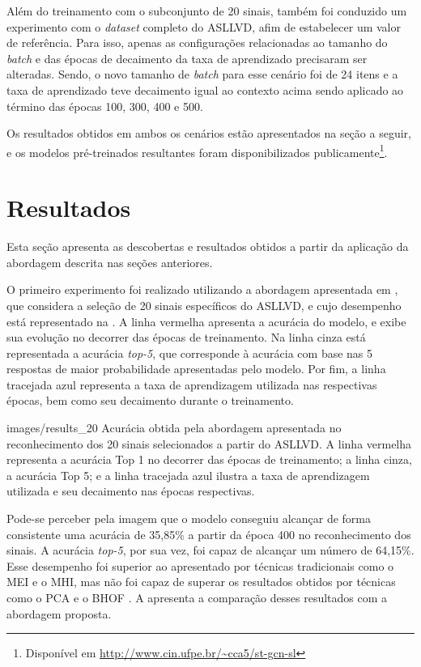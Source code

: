 Além do treinamento com o subconjunto de 20 sinais, também foi conduzido um experimento com o \textit{dataset} completo do ASLLVD, afim de estabelecer um valor de referência. Para isso, apenas as configurações relacionadas ao tamanho do \textit{batch} e das épocas de decaimento da taxa de aprendizado precisaram ser alteradas. Sendo, o novo tamanho de \textit{batch} para esse cenário foi de 24 itens e a taxa de aprendizado teve decaimento igual ao contexto acima sendo aplicado ao término das épocas 100, 300, 400 e 500.

Os resultados obtidos em ambos os cenários estão apresentados na seção a seguir, e os modelos pré-treinados resultantes foram disponibilizados publicamente\footnote{
    Disponível em \url{http://www.cin.ufpe.br/~cca5/st-gcn-sl}
}.


\section{Resultados} %
\label{sec:resultados}

Esta seção apresenta as descobertas e resultados obtidos a partir da aplicação da abordagem descrita nas seções anteriores. 

O primeiro experimento foi realizado utilizando a abordagem apresentada em \cite{lim-2016}, que considera a seleção de 20 sinais específicos do ASLLVD, e cujo desempenho está representado na . A linha vermelha apresenta a acurácia do modelo, e exibe sua evolução no decorrer das épocas de treinamento. Na linha cinza está representada a acurácia \textit{top-5}, que corresponde à acurácia com base nas 5 respostas de maior probabilidade apresentadas pelo modelo. Por fim, a linha tracejada azul representa a taxa de aprendizagem utilizada nas respectivas épocas, bem como seu decaimento durante o treinamento.

    {images/results_20}
    {Acurácia obtida pela abordagem apresentada no reconhecimento dos 20 sinais selecionados a partir do ASLLVD. A linha vermelha representa a acurácia Top 1 no decorrer das épocas de treinamento; a linha cinza, a acurácia Top 5; e a linha tracejada azul ilustra a taxa de aprendizagem utilizada e seu decaimento nas épocas respectivas.}

Pode-se perceber pela imagem que o modelo conseguiu alcançar de forma consistente uma acurácia de 35,85\% a partir da época 400 no reconhecimento dos sinais. A acurácia \textit{top-5}, por sua vez, foi capaz de alcançar um número de 64,15\%. Esse desempenho foi superior ao apresentado por técnicas tradicionais como o MEI e o MHI, mas não foi capaz de superar os resultados obtidos por técnicas como o PCA e o BHOF \cite{lim-2016}. A  apresenta a comparação desses resultados com a abordagem proposta.

